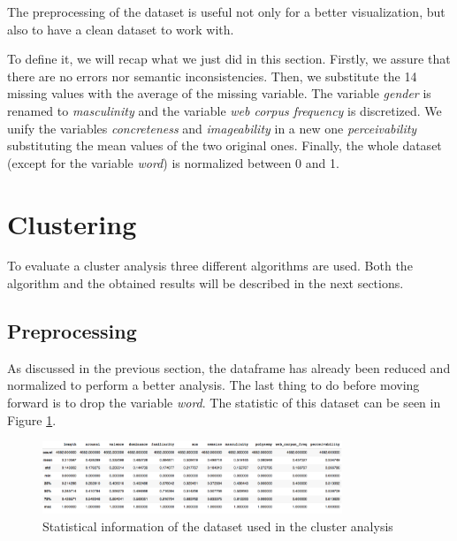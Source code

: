 \documentclass[a4paper,11pt,dvipsnames]{article}
\begin{document}
The preprocessing of the dataset is useful not only for a better visualization, but also to have a clean dataset to work with. 


To define it, we will recap what we just did in this section.
Firstly, we assure that there are no errors nor semantic inconsistencies. Then, we substitute the 14 missing values with the average of the missing variable. The variable \textit{gender} is renamed to \textit{masculinity} and the variable \textit{web corpus frequency} is discretized. We unify the variables \textit{concreteness} and \textit{imageability} in a new one \textit{perceivability} substituting the mean values of the two original ones. Finally, the whole dataset (except for the variable \textit{word}) is normalized between 0 and 1.

\section{Clustering}

To evaluate a cluster analysis three different algorithms are used. Both the algorithm and the obtained results will be described in the next sections.

\subsection{Preprocessing}
As discussed in the previous section, the dataframe has already been reduced and normalized to perform a better analysis. The last thing to do before moving forward is to drop the variable \textit{word}. The statistic of this dataset can be seen in Figure \ref{tab:stat2}.

\begin{figure}[h]
    \centering
    \includegraphics[width=0.8\textwidth]{stat2.png}
    \caption{Statistical information of the dataset used in the cluster analysis}
    \label{tab:stat2}
\end{figure}
\end{document}
